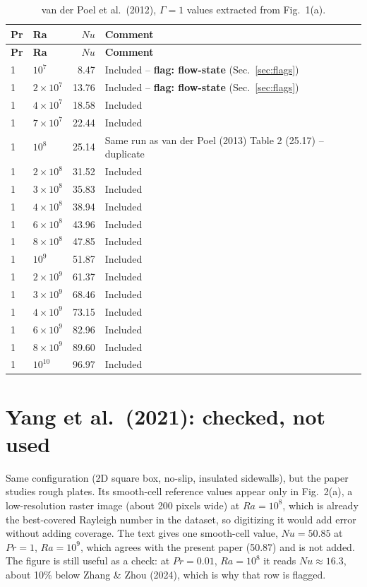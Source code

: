 \documentclass[11pt]{article}
\begin{document}
\begin{longtable}{l l r p{9cm}}
\caption{van der Poel et al.\ (2012), $\Gamma=1$ values extracted from Fig.~1(a).}\label{tab:vdp2012}\\
\toprule
\textbf{Pr} & \textbf{Ra} & $Nu$ & \textbf{Comment} \\
\midrule
\endfirsthead
\toprule
\textbf{Pr} & \textbf{Ra} & $Nu$ & \textbf{Comment} \\
\midrule
\endhead
\bottomrule
\endfoot
\rowcolor{included} 1 & $10^{7}$ & 8.47 & Included -- \textbf{flag: flow-state} (Sec.~\ref{sec:flags}) \\
\rowcolor{included} 1 & $2\times10^{7}$ & 13.76 & Included -- \textbf{flag: flow-state} (Sec.~\ref{sec:flags}) \\
\rowcolor{included} 1 & $4\times10^{7}$ & 18.58 & Included \\
\rowcolor{included} 1 & $7\times10^{7}$ & 22.44 & Included \\
\rowcolor{excluded} 1 & $10^{8}$ & 25.14 & Same run as van der Poel (2013) Table 2 (25.17) -- duplicate \\
\rowcolor{included} 1 & $2\times10^{8}$ & 31.52 & Included \\
\rowcolor{included} 1 & $3\times10^{8}$ & 35.83 & Included \\
\rowcolor{included} 1 & $4\times10^{8}$ & 38.94 & Included \\
\rowcolor{included} 1 & $6\times10^{8}$ & 43.96 & Included \\
\rowcolor{included} 1 & $8\times10^{8}$ & 47.85 & Included \\
\rowcolor{included} 1 & $10^{9}$ & 51.87 & Included \\
\rowcolor{included} 1 & $2\times10^{9}$ & 61.37 & Included \\
\rowcolor{included} 1 & $3\times10^{9}$ & 68.46 & Included \\
\rowcolor{included} 1 & $4\times10^{9}$ & 73.15 & Included \\
\rowcolor{included} 1 & $6\times10^{9}$ & 82.96 & Included \\
\rowcolor{included} 1 & $8\times10^{9}$ & 89.60 & Included \\
\rowcolor{included} 1 & $10^{10}$ & 96.97 & Included \\
\end{longtable}

\section{Yang et al.\ (2021): checked, not used}\label{sec:yang}
Same configuration (2D square box, no-slip, insulated sidewalls), but the
paper studies rough plates. Its smooth-cell reference values appear only in
Fig.~2(a), a low-resolution raster image (about 200 pixels wide) at
$Ra=10^8$, which is already the best-covered Rayleigh number in the
dataset, so digitizing it would add error without adding coverage. The text
gives one smooth-cell value, $Nu=50.85$ at $Pr=1$, $Ra=10^9$, which agrees
with the present paper (50.87) and is not added. The figure is still useful
as a check: at $Pr=0.01$, $Ra=10^8$ it reads $Nu\approx16.3$, about 10\%
below Zhang \& Zhou (2024), which is why that row is flagged.
\end{document}
